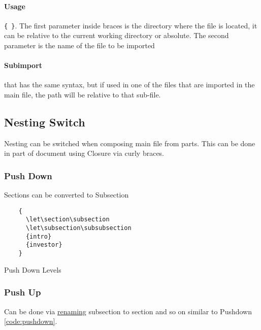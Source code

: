 \documentclass{report}[a4paper,12pt] %
\begin{document}
\paragraph{Usage} \verb|{ }|. The first parameter inside braces is the directory where the file is located, it can be relative to the current working directory or absolute. The second parameter is the name of the file to be imported

\paragraph{Subimport} \verb|| that has the same syntax, but if used in one of the files that are imported in the main file, the path will be relative to that sub-file.

\subsection{Nesting Switch}
Nesting can be switched when composing main file from parts.
This can be done in part of document using Closure via curly braces.

\subsubsection{Push Down}
Sections can be converted to Subsection

\begin{listing}[h]
  \begin{verbatim}
    {
      \let\section\subsection
      \let\subsection\subsubsection
      {intro}
      {investor}
    }
  \end{verbatim}
  \caption{Push Down Levels}
  \label{code:pushdown}
\end{listing}

\subsubsection{Push Up}
Can be done via \href{https://tex.stackexchange.com/questions/291771/is-it-possible-to-input-a-file-while-lowering-every-section-it-has-by-1-level}{renaming} subsection to section and so on similar to Pushdown \ref{code:pushdown}.
\end{document}
